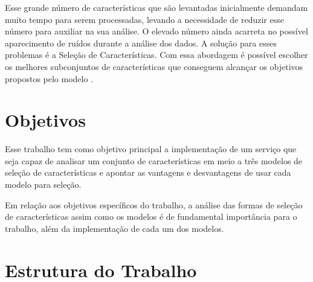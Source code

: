 Esse grande número de características que são levantadas inicialmente demandam muito tempo para serem processadas, levando a necessidade de reduzir esse número para auxiliar na sua análise. O elevado número ainda acarreta no possível aparecimento de ruídos durante a análise dos dados. A solução para esses problemas é a Seleção de Características. Com essa abordagem é possível escolher os melhores subconjuntos de características que conseguem alcançar os objetivos propostos pelo modelo \cite{molina_2002}. 


\section{Objetivos}
Esse trabalho tem como objetivo principal a implementação de um serviço que seja capaz de analisar um conjunto de características em meio a três modelos de seleção de características e apontar as vantagens e desvantagens de usar cada modelo para seleção.

Em relação aos objetivos específicos do trabalho, a análise das formas de seleção de características assim como os modelos é de fundamental importância para o trabalho, além da implementação de cada um dos modelos.

\section{Estrutura do Trabalho}


